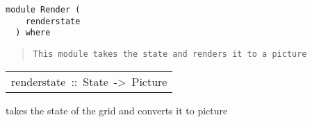 \label{module:Render}
\haddockbeginheader
{\haddockverb\begin{verbatim}
module Render (
    renderstate
  ) where\end{verbatim}}
\haddockendheader

\begin{quote}
{\haddockverb\begin{verbatim}
This module takes the state and renders it to a picture\end{verbatim}}
\end{quote}

\begin{haddockdesc}
\item[\begin{tabular}{@{}l}
renderstate\ ::\ State\ ->\ Picture
\end{tabular}]\haddockbegindoc
{} takes the state of the grid and converts it to picture\par

\end{haddockdesc}